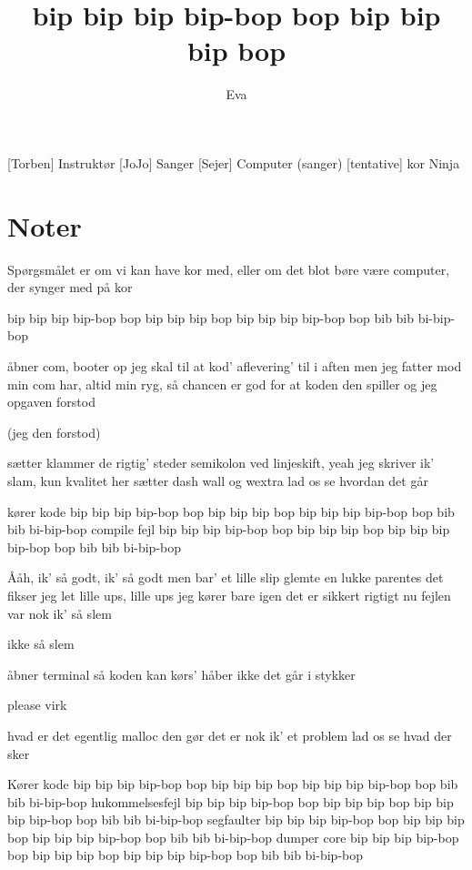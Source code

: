 \documentclass[a4paper,11pt]{article}
\title{bip bip bip bip-bop bop bip bip bip bop}
\author{Eva}
\begin{document}
\maketitle


\begin{roles}
 [Torben] Instruktør
 [JoJo] Sanger
 [Sejer] Computer (sanger)
 [tentative] kor
 Ninja 
\end{roles}
\section*{Noter}
Spørgsmålet er om vi kan have kor med, eller om det blot børe være computer, der synger med på kor

\begin{song}


%
bip bip bip bip-bop bop bip bip bip bop
bip bip bip bip-bop bop bib bib bi-bip-bop

%
åbner com, booter op
jeg skal til at kod’
aflevering’ til i aften
men jeg fatter mod
min com har, altid min
ryg, så chancen er god
for at koden den spiller 
    og jeg opgaven forstod

%
(jeg den forstod)

%
sætter klammer de rigtig’ steder
semikolon ved linjeskift, yeah
jeg skriver ik’ slam, kun kvalitet her
sætter dash wall og wextra  
    lad os se hvordan det går

%
kører kode
bip bip bip bip-bop bop bip bip bip bop
bip bip bip bip-bop bop bib bib bi-bip-bop
compile fejl
bip bip bip bip-bop bop bip bip bip bop
bip bip bip bip-bop bop bib bib bi-bip-bop

%
Ååh, ik’ så godt, ik’ så godt
men bar’ et lille slip
glemte en lukke parentes
det fikser jeg let
lille ups, lille ups
jeg kører bare igen
det er sikkert rigtigt nu
    fejlen var nok ik’ så slem

%
ikke så slem

%
åbner terminal så koden kan kørs’
håber ikke det går i stykker

%
please virk

%
hvad er det egentlig malloc den gør
det er nok ik’ et problem
    lad os se hvad der sker

%
Kører kode
bip bip bip bip-bop bop bip bip bip bop
bip bip bip bip-bop bop bib bib bi-bip-bop
hukommelsesfejl
bip bip bip bip-bop bop bip bip bip bop
bip bip bip bip-bop bop bib bib bi-bip-bop
segfaulter
bip bip bip bip-bop bop bip bip bip bop
bip bip bip bip-bop bop bib bib bi-bip-bop
dumper core
bip bip bip bip-bop bop bip bip bip bop
bip bip bip bip-bop bop bib bib bi-bip-bop


\end{song}
\end{document}
